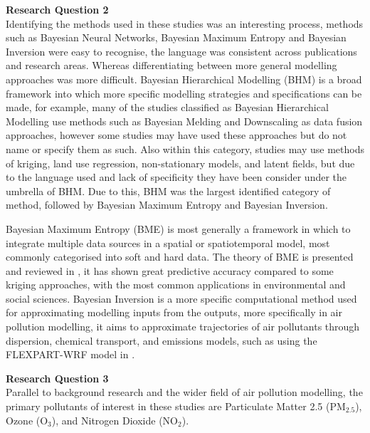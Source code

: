 \textbf{Research Question 2}\\
Identifying the methods used in these studies was an interesting process, methods such as Bayesian Neural Networks, Bayesian Maximum Entropy and Bayesian Inversion were easy to recognise, the language was consistent across publications and research areas. Whereas differentiating between more general modelling approaches was more difficult. Bayesian Hierarchical Modelling (BHM) is a broad framework into which more specific modelling strategies and specifications can be made, for example, many of the studies classified as Bayesian Hierarchical Modelling use methods such as Bayesian Melding and Downscaling as data fusion approaches, however some studies may have used these approaches but do not name or specify them as such. Also within this category, studies may use methods of kriging, land use regression, non-stationary models, and latent fields, but due to the language used and lack of specificity they have been consider under the umbrella of BHM. Due to this, BHM was the largest identified category of method, followed by Bayesian Maximum Entropy and Bayesian Inversion. 

Bayesian Maximum Entropy (BME) is most generally a framework in which to integrate multiple data sources in a spatial or spatiotemporal model, most commonly categorised into soft and hard data. The theory of BME is presented and reviewed in \cite{He2017BayesianReview}, it has shown great predictive accuracy compared to some kriging approaches, with the most common applications in environmental and social sciences. Bayesian Inversion is a more specific computational method used for approximating modelling inputs from the outputs, more specifically in air pollution modelling, it aims to approximate trajectories of air pollutants through dispersion, chemical transport, and emissions models, such as using the FLEXPART-WRF model in \cite{Cui2019InversionMeasurements}.

\textbf{Research Question 3}\\
Parallel to background research and the wider field of air pollution modelling, the primary pollutants of interest in these studies are Particulate Matter 2.5 (PM$_2.5$), Ozone (O$_3$), and Nitrogen Dioxide (NO$_2$). 


